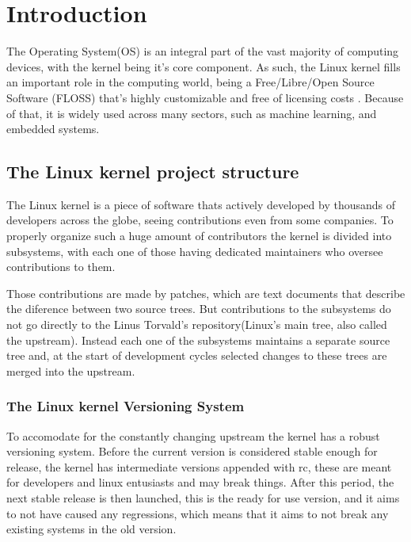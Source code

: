 \section{Introduction}
\label{chp:introduction} 

The Operating System(OS) is an integral part of the vast majority of computing devices, with the kernel being it's core component. As such, the Linux kernel fills an important role in the computing world, being a Free/Libre/Open Source Software (FLOSS) that's highly customizable and free of licensing costs \cite{sbes}. Because of that, it is widely used across many sectors, such as machine learning, and embedded systems. 

\subsection{The Linux kernel project structure}
    The Linux kernel is a piece of software thats actively developed by thousands of developers across the globe, seeing contributions even from some companies. To properly organize such a huge amount of contributors the kernel is divided into subsystems, with each one of those having dedicated maintainers who oversee contributions to them.\cite{sbes}

    Those contributions are made by patches, which are text documents that describe the diference between two source trees. But contributions to the subsystems do not go directly to the Linus Torvald's repository(Linux's main tree, also called the upstream). Instead each one of the subsystems maintains a separate source tree and, at the start of development cycles selected changes to these trees are merged into the upstream. \cite{KernelDocs}

\subsubsection{The Linux kernel Versioning System}

    To accomodate for the constantly changing upstream the kernel has a robust versioning system. Before the current version is considered stable enough for release, the kernel has intermediate versions appended with rc, these are meant for developers and linux entusiasts and may break things. After this period, the next stable release is then launched, this is the ready for use version, and it aims to not have caused any regressions, which means that it aims to not break any existing systems in the old version.
    
